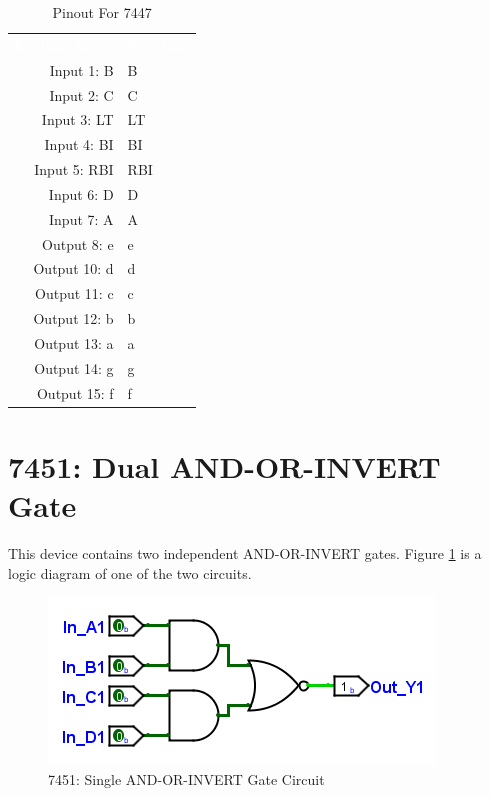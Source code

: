 \begin{table}[H]
	\sffamily
	\newcommand{\head}[1]{\textcolor{white}{\textbf{#1}}}		
	\begin{center}
		\begin{tabular}{rl} 
			\rowcolor{black!75}
			\head{Logisim Label} & \head{Function} \\
			Input 1: B   & B   \\
			Input 2: C   & C   \\
			Input 3: LT  & LT  \\
			Input 4: BI  & BI  \\
			Input 5: RBI & RBI \\
			Input 6: D   & D   \\
			Input 7: A   & A   \\
			Output 8: e  & e   \\
			Output 10: d & d   \\
			Output 11: c & c   \\
			Output 12: b & b   \\
			Output 13: a & a   \\
			Output 14: g & g   \\
			Output 15: f & f   \\
		\end{tabular}
	\end{center}
	\caption{Pinout For 7447}
	\label{tab:50-7447a}
\end{table}

\section{7451: Dual AND-OR-INVERT Gate}

This device contains two independent AND-OR-INVERT gates. Figure \ref{fig:app_ttl-7451} is a logic diagram of one of the two circuits.

\begin{figure}[H]
	\centering
	\includegraphics{gfx/app_ttl-7451}
	\caption{7451: Single AND-OR-INVERT Gate Circuit}
	\label{fig:app_ttl-7451}
\end{figure}

